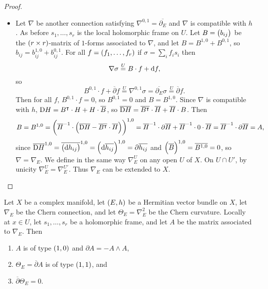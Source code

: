 \begin{proof}
\begin{itemize}
\item Let $ \nabla $ be another connection satisfying $ \nabla^{0, 1} = \overline{\partial_E} $ and $ \nabla $ is compatible with $ h $. As before $ s_1, \dots, s_r $ is the local holomorphic frame on $ U $. Let $ B = \br{b_{ij}} $ be the $ \br{r \times r} $-matrix of $ 1 $-forms associated to $ \nabla $, and let $ B = B^{1, 0} + B^{0, 1} $, so $ b_{ij} = b_{ij}^{1, 0} + b_{ij}^{0, 1} $. For all $ f = \br{f_1, \dots, f_r} $ if $ \sigma = \sum_i f_is_i $ then
$$ \nabla\sigma \overset{U}{=} B \cdot f + \mathrm{d} f, $$
so
$$ B^{0, 1} \cdot f + \overline{\partial}f \overset{U}{=} \nabla^{0, 1}\sigma = \overline{\partial_E}\sigma \overset{U}{=} \overline{\partial}f. $$
Then for all $ f $, $ B^{0, 1} \cdot f = 0 $, so $ B^{0, 1} = 0 $ and $ B = B^{1, 0} $. Since $ \nabla $ is compatible with $ h $, $ \mathrm{D} H = B^\intercal \cdot H + H \cdot \overline{B} $, so $ \overline{\mathrm{D} H} = \overline{B^\intercal} \cdot \overline{H} + \overline{H} \cdot B $. Then
$$ B = B^{1, 0} = \br{\overline{H}^{-1} \cdot \br{\overline{\D H} - \overline{B^\intercal} \cdot \overline{H}}}^{1, 0} = \overline{H}^{-1} \cdot \partial\overline{H} + \overline{H}^{-1} \cdot 0 \cdot \overline{H} = \overline{H}^{-1} \cdot \partial\overline{H} = A, $$
since $ \overline{\D H}^{1, 0} = \overline{\br{\d h_{ij}}}^{1, 0} = \br{\d \overline{h_{ij}}}^{1, 0} = \partial\overline{h_{ij}} $ and $ \br{\overline{B}}^{1, 0} = \overline{B^{1, 0}} = 0 $, so $ \nabla = \nabla_E $. We define in the same way $ \nabla_E^U $ on any open $ U $ of $ X $. On $ U \cap U' $, by unicity $ \nabla_E^U = \nabla_E^{U'} $. Thus $ \nabla_E $ can be extended to $ X $.
\end{itemize}
\end{proof}

\begin{corollary}
\label{cor:5.11}
Let $ X $ be a complex manifold, let $ \br{E, h} $ be a Hermitian vector bundle on $ X $, let $ \nabla_E $ be the Chern connection, and let $ \Theta_E = \nabla_E^2 $ be the Chern curvature. Locally at $ x \in U $, let $ s_1, \dots, s_r $ be a holomorphic frame, and let $ A $ be the matrix associated to $ \nabla_E $. Then
\begin{enumerate}
\item $ A $ is of type $ \br{1, 0} $ and $ \partial A = -A \wedge A $,
\item $ \Theta_E = \overline{\partial}A $ is of type $ \br{1, 1} $, and
\item $ \overline{\partial}\Theta_E = 0 $.
\end{enumerate}
\end{corollary}

